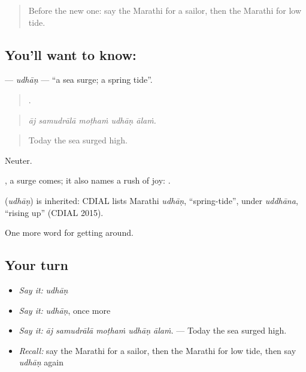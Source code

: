 \begin{quote}
Before the new one: say the Marathi for a sailor, then the Marathi for low tide.
\end{quote}

\subsection*{You'll want to know: }
\textbf{} — \emph{udhāṇ} — \textquotedblleft{}a sea surge; a spring tide\textquotedblright{}.

\begin{quote}
    .
\end{quote}

\begin{quote}
\emph{āj samudrālā moṭhaṁ udhāṇ ālaṁ.}
\end{quote}

\begin{quote}
Today the sea surged high.
\end{quote}

Neuter.

 , a surge comes; it also names a rush of joy:   .

\begin{cousinweb}
\textbf{} (\emph{udhāṇ}) is inherited: CDIAL lists Marathi \emph{udhāṇ}, \textquotedblleft{}spring-tide\textquotedblright{}, under \emph{uddhāna}, \textquotedblleft{}rising up\textquotedblright{} (CDIAL 2015).
\end{cousinweb}

\begin{grammarlens}[title={What you've built}]
One more word for getting around.
\end{grammarlens}

\subsection*{Your turn}
\begin{itemize}
\raggedright
  \item \emph{Say it:} \emph{udhāṇ}
  \item \emph{Say it:} \emph{udhāṇ}, once more
  \item \emph{Say it:} \emph{āj samudrālā moṭhaṁ udhāṇ ālaṁ.} — Today the sea surged high.
  \item \emph{Recall:} say the Marathi for a sailor, then the Marathi for low tide, then say \emph{udhāṇ} again
\end{itemize}

